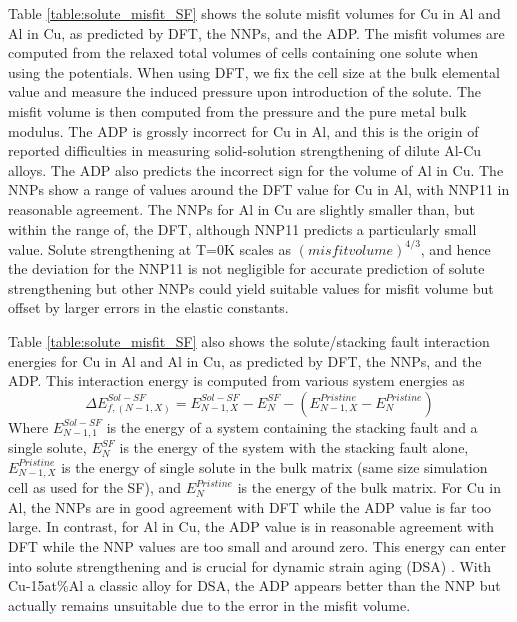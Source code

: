 \documentclass{article}
\begin{document}
Table \ref{table:solute_misfit_SF} shows the solute misfit volumes for Cu in Al and Al in Cu, as predicted by DFT, the NNPs, and the ADP.  The misfit volumes are computed from the relaxed total volumes of cells containing one solute when using the potentials.  When using DFT, we fix the cell size at the bulk elemental value and measure the induced pressure upon introduction of the solute.  The misfit volume is then computed from the pressure and the pure metal bulk modulus.  The ADP is grossly incorrect for Cu in Al, and this is the origin of reported difficulties in measuring solid-solution strengthening of dilute Al-Cu alloys\cite{Singh2013AnAlloy}.   The ADP also predicts the incorrect sign for the volume of Al in Cu.  The NNPs show a range of values around the DFT value for Cu in Al, with NNP11 in reasonable agreement.  The NNPs for Al in Cu are slightly smaller than, but within the range of, the DFT, although NNP11 predicts a particularly small value.  Solute strengthening at T=0K scales as $(misfit volume)^{4/3}$, and hence the deviation for the NNP11 is not negligible for accurate prediction of solute strengthening but other NNPs could yield suitable values for misfit volume but offset by larger errors in the elastic constants.

Table \ref{table:solute_misfit_SF} also shows the solute/stacking fault interaction energies for Cu in Al and Al in Cu, as predicted by DFT, the NNPs, and the ADP.
This interaction energy is computed from various system energies as
\begin{equation}
\Delta E^{Sol-SF}_{f,(N-1,X)} = E^{Sol-SF}_{N-1,X} - E^{SF}_{N} - (E^{Pristine}_{N-1,X}-E^{Pristine}_{N})
\end{equation}
Where $E^{Sol-SF}_{N-1,1}$ is the energy of a system containing the stacking fault and a single solute,
$E^{SF}_{N}$ is the energy of the system with the stacking fault alone,
$E^{Pristine}_{N-1,X}$ is the energy of single solute in the bulk matrix (same size simulation cell as used for the SF), 
and $E^{Pristine}_{N}$ is the energy of the bulk matrix. 
For Cu in Al, the NNPs are in good agreement with DFT while the ADP value is far too large.  In contrast, for Al in Cu, the ADP value
is in reasonable agreement with DFT while the NNP values are too small and around zero.  This energy can enter into solute strengthening\cite{Leyson2010} and is crucial for dynamic strain aging (DSA) \cite{Curtin2006}.  With Cu-15at\%Al a classic alloy for DSA, the ADP appears better than the NNP but actually remains unsuitable due to the error in the misfit volume.
\end{document}
